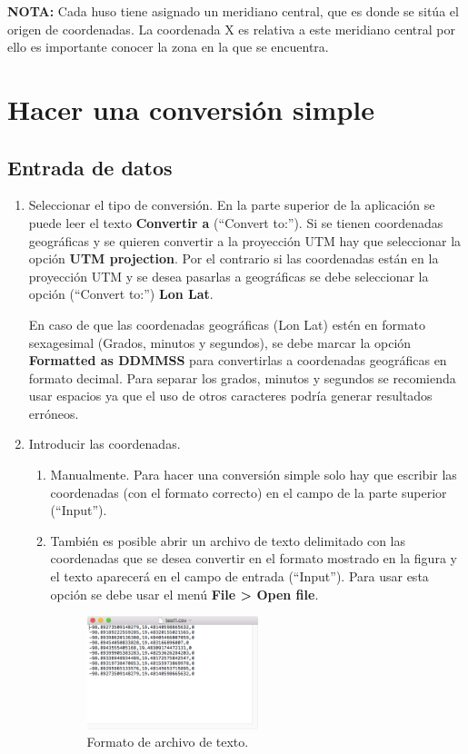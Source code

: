 \documentclass[12pt, letterpaper]{article}
\begin{document}
\textbf{NOTA:} Cada huso tiene asignado un meridiano central, que es donde se sitúa el origen de coordenadas. La coordenada X es relativa a este meridiano central por ello es importante conocer la zona en la que se encuentra.

\section{Hacer una conversión simple}

\subsection{Entrada de datos}

\begin{enumerate}
\item Seleccionar el tipo de conversión. En la parte superior de la aplicación se puede leer el texto \textbf{Convertir a} (``Convert to:''). Si se tienen coordenadas geográficas y se quieren convertir a la proyección UTM hay que seleccionar la opción \textbf{UTM projection}. Por el contrario si las coordenadas están en la proyección UTM y se desea pasarlas a geográficas se debe seleccionar la opción (``Convert to:'') \textbf{Lon Lat}.

En caso de que las coordenadas geográficas (Lon Lat) estén en formato sexagesimal (Grados, minutos y segundos), se debe marcar la opción \textbf{Formatted as DDMMSS} para convertirlas a coordenadas geográficas en formato decimal. Para separar los grados, minutos y segundos se recomienda usar espacios ya que el uso de otros caracteres podría generar resultados erróneos.

\item Introducir las coordenadas.
	\begin{enumerate}
	\item Manualmente. Para hacer una conversión simple solo hay que escribir las coordenadas (con el formato correcto) en el campo de la parte superior (``Input'').
	\item También es posible abrir un archivo de texto delimitado con las coordenadas que se desea convertir en el formato mostrado en la figura y el texto aparecerá en el campo de entrada (``Input''). Para usar esta opción se debe usar el menú \textbf{File > Open file}.
	
	\begin{figure}[h]
	    \centering
	    \includegraphics[width=0.5\textwidth]{img/textfile.png}
	    \caption{Formato de archivo de texto.}
	    \label{fig:textfile}
	\end{figure}
	
	\end{enumerate}
\end{enumerate}
\end{document}
